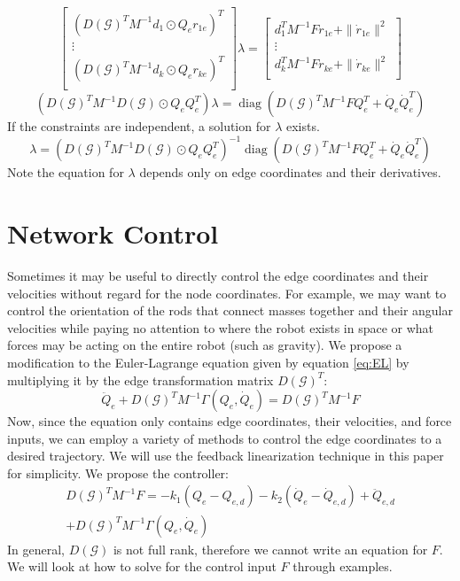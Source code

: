 \documentclass[conference]{article} %
\DeclareMathOperator{\diag}{diag}
\begin{document}
$$\begin{bmatrix}
    \left(D(\mathcal{G})^TM^{-1}d_1\odot Q_er_{1e}\right)^T\\
    \vdots\\
    \left(D(\mathcal{G})^TM^{-1}d_k\odot Q_er_{ke}\right)^T\\
\end{bmatrix}\lambda=\begin{bmatrix}
    d_1^TM^{-1}Fr_{1e}+\|\dot{r}_{1e}\|^2\\
    \vdots\\
    d_k^TM^{-1}Fr_{ke}+\|\dot{r}_{ke}\|^2\\
\end{bmatrix}$$
$$\left(D(\mathcal{G})^TM^{-1}D(\mathcal{G})\odot Q_eQ_e^T\right)\lambda=\diag\left(D(\mathcal{G})^TM^{-1}FQ_e^T+\dot{Q}_e\dot{Q}_e^T\right)$$
If the constraints are independent, a solution for $\lambda$ exists.
\begin{equation} \label{eq:lambda}
    \lambda=\left(D(\mathcal{G})^TM^{-1}D(\mathcal{G})\odot Q_eQ_e^T\right)^{-1}\diag\left(D(\mathcal{G})^TM^{-1}FQ_e^T+\dot{Q}_e\dot{Q}_e^T\right)
\end{equation}
Note the equation for $\lambda$ depends only on edge coordinates and their derivatives.

\section{Network Control}
Sometimes it may be useful to directly control the edge coordinates and their velocities without regard for the node coordinates. For example, we may want to control the orientation of the rods that connect masses together and their angular velocities while paying no attention to where the robot exists in space or what forces may be acting on the entire robot (such as gravity). We propose a modification to the Euler-Lagrange equation given by equation \ref{eq:EL} by multiplying it by the edge transformation matrix $D(\mathcal{G})^T$:
$$\ddot{Q}_e+D(\mathcal{G})^TM^{-1}\Gamma(Q_e,\dot{Q}_e)=D(\mathcal{G})^TM^{-1}F$$
Now, since the equation only contains edge coordinates, their velocities, and force inputs, we can employ a variety of methods to control the edge coordinates to a desired trajectory. We will use the feedback linearization technique in this paper for simplicity. We propose the controller:
\begin{multline} \label{eq:controller}
    D(\mathcal{G})^TM^{-1}F=-k_1(Q_e-Q_{e,d})-k_2(\dot{Q}_e-\dot{Q}_{e,d})+\ddot{Q}_{e,d}\\
    +D(\mathcal{G})^TM^{-1}\Gamma(Q_e, \dot{Q}_e)
\end{multline}
In general, $D(\mathcal{G})$ is not full rank, therefore we cannot write an equation for $F$. We will look at how to solve for the control input $F$ through examples.
\end{document}
